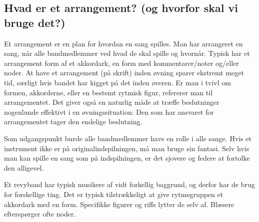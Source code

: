 \subsection{Hvad er et arrangement? (og hvorfor skal vi bruge det?)}

Et arrangement er en plan for hvordan en sang spilles. Man har arrangeret en sang, når alle bandmedlemmer ved hvad de skal spille og hvornår. Typisk har et arrangement form af et akkordark, en form med kommentarer/noter og/eller noder.
At have et arrangement (på skrift) inden øvning sparer ekstremt meget tid, særligt hvis bandet har kigget på det inden øveren. Er man i tvivl om formen, akkorderne, eller en bestemt rytmisk figur, refererer man til arrangementet.
Det giver også en naturlig måde at træffe beslutninger nogenlunde effektivt i en øvningssituation: Den som har ansvaret for arrangementet tager den endelige beslutning.

Som udgangspunkt burde alle bandmedlemmer have en rolle i alle sange. Hvis et instrument ikke er på originalindspilningen, må man bruge sin fantasi. Selv hvis man kan spille en sang som på indspilningen, er det sjovere og federe at fortolke den alligevel.

Et revyband har typisk musikere af vidt forkellig baggrund, og derfor har de brug for forskellige ting.
Det er typisk tilstrækkeligt at give rytmegruppen et akkordark med en form. Specifikke figurer og riffs lytter de selv af.
Blæsere efterspørger ofte noder.

